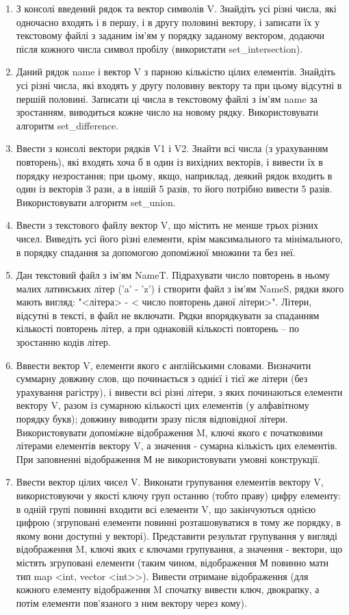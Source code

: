 \documentclass[a5paper,titlepage,openany,twoside,
]
{book_unv}%
\begin{document}
\begin{enumerate}
\item
З консолі введений рядок та вектор символів V. 
Знайдіть усі різні числа, які одночасно входять
і в першу, і в другу половині вектору, і записати їх 
у текстовому файлі з заданим ім'ям у порядку заданому вектором, додаючи
після кожного числа символ пробілу (використати set\_intersection).
\item
Даний рядок name і вектор V з парною кількістю цілих елементів.
 Знайдіть усі різні числа, які входять у другу половину
вектору та при цьому відсутні в першій половині. Записати 
ці числа в текстовому файлі з ім'ям name за зростанням,
виводиться кожне число на новому рядку. Використовувати алгоритм set\_difference.
\item
Ввести з консолі вектори рядків V1 і V2. Знайти всі числа (з урахуванням повторень),
 які входять хоча б в один із вихідних векторів, і вивести їх
в порядку незростання; при цьому, якщо, наприклад, деякий рядок
входить в один із векторів 3 рази, а в іншій 5 разів, то його потрібно вивести 5 разів.
Використовувати алгоритм set\_union.
\item
Ввести з текстового файлу вектор V, що містить не менше трьох різних чисел.
Виведіть усі його різні елементи, крім максимального та мінімального, 
в порядку спадання за допомогою допоміжної множини та без неї.
\item
  Дан текстовий файл з ім'ям NameT. Підрахувати число повторень в ньому
  малих латинських літер ('a' - 'z') і створити файл з ім'ям NameS,
  рядки якого мають вигляд: "\textless{}літера\textgreater{} -
  \textless{} число повторень даної літери\textgreater{}". Літери,
  відсутні в тексті, в файл не включати. Рядки впорядкувати за спаданням
  кількості повторень літер, а при однаковій кількості повторень -- по
  зростанню кодів літер.

\item
Вввести вектор V, елементи якого є англійськими словами. Визначити суммарну довжину
слов, що починається з однієї і тієї же літери (без урахування рагістру),
 і вивести всі різні літери, з яких починаються елементи вектору V, разом із сумарною кількості цих елементів (у алфавітному порядку букв); довжину виводити зразу 
після відповідної літери. Використовувати допоміжне відображення M, ключі якого є початковими 
літерами елементів вектору V, а значення - сумарна кількість цих елементів. 
При заповненні відображення М не використовувати умовні конструкції.

\item
Ввести вектор цілих чисел V. Виконати групування елементів вектору V,
 використовуючи у якості ключу груп останню (тобто праву) 
цифру елементу: в одній групі повинні входити всі елементи V,
що закінчуються однією цифрою (згруповані 
елементи повинні розташовуватися в тому же порядку, в якому вони
доступні у векторі). Представити результат групування у вигляді відображення M, 
ключі яких є ключами групування, а значення - вектори, що містять згруповані
елементи (таким чином, відображення М повинно мати тип
map <int, vector <int>>). Вивести отримане відображення (для кожного
елементу відображення M спочатку вивести ключ, двокрапку, а потім елементи
пов'язаного з ним вектору через кому).




\end{enumerate}
\end{document}
